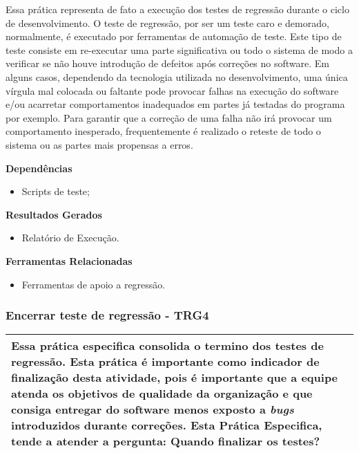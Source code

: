Essa prática representa de fato a execução dos testes de regressão durante o ciclo de desenvolvimento. O teste de regressão, por ser um teste caro e demorado, normalmente, é executado por ferramentas de automação de teste. Este tipo de teste consiste em re-executar uma parte significativa ou todo o sistema de modo a verificar se não houve introdução de defeitos após correções no software. Em alguns casos, dependendo da tecnologia utilizada no desenvolvimento, uma única vírgula mal colocada ou faltante pode provocar falhas na execução do software e/ou acarretar comportamentos inadequados em partes já testadas do programa por exemplo. Para garantir que a correção de uma falha não irá provocar um comportamento inesperado, frequentemente é realizado o reteste de todo o sistema ou as partes mais propensas a erros.


\textbf{Dependências}
\begin{itemize}
    \item Scripts de teste;
\end{itemize}

\textbf{Resultados Gerados}
\begin{itemize}
    \item Relatório de Execução.
\end{itemize}

\textbf{Ferramentas Relacionadas}
\begin{itemize}
    \item Ferramentas de apoio a regressão.
\end{itemize}

\subsubsection{Encerrar teste de regressão - TRG4}
\label{sec:trg4}

\begin{table}[H]
\centering
\begin{tabular}{|p{130mm}|}
\hline
Essa prática especifica consolida o termino dos testes de regressão. Esta prática é importante como indicador de finalização desta atividade, pois é importante que a equipe atenda os objetivos de qualidade da organização e que consiga entregar do software menos exposto a \textit{bugs} introduzidos durante correções. Esta Prática Especifica, tende a atender a pergunta: Quando finalizar os testes?\\
\hline
\end{tabular}
\end{table}

